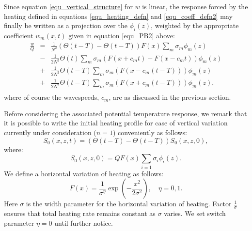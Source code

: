 \documentclass[a4paper,10pt]{article}
\newcommand{\heavi}{\Theta}
\begin{document}
Since equation \ref{equ_vertical_structure} for $w$ is linear, the response forced by the heating defined in equations \ref{equ_heating_defn} and \ref{equ_coeff_defn2}
may finally be written as a projection over the $\phi_i(z)$, weighted by the appropriate coefficient $w_m (x,t)$ given in 
equation \ref{equ_PB2} above:
%
\begin{eqnarray}
\label{equ_w_response}
\frac{w}{Q} & = & \frac{1}{N^2}    \left(\heavi( t-T)  - \heavi( t-T) \right) F(x)                  \sum_m \sigma_m \phi_m(z) \\ \nonumber
                  & - & \frac{1}{2N^2}    \heavi( t)                  \sum_m  \sigma_m  \left(  F(x + c_m t) + F(x - c_m t) \right)  \phi_m(z) \\ \nonumber
                  & + & \frac{1}{2 N^2} \heavi( t-T)  \sum_m \sigma_m  \left( F(x-c_m (t-T)) \right)  \phi_m(z) \\ \nonumber
                  & + & \frac{1}{2 N^2}  \heavi( t-T) \sum_m  \sigma_m \left( F(x+ c_m (t-T))  \right)  \phi_m(z), \\ \nonumber
\end{eqnarray}
%
where of course the wavespeeds, $c_m$, are as discussed in the previous section.

Before considering the associated potential temperature response, we remark that it is possible to 
write the initial heating profile for case of vertical variation currently under consideration ($n=1$) conveniently as follows: 
%
\begin{equation}
\label{equ_3}
S_{0}(x,z,t) = (\heavi( t-T)  - \heavi(t-T) ) S_0(x,z,0),
 \end{equation}
%
where:
%
\begin{equation}
 S_0 (x,z,0) = Q F(x) \sum_{i=1} \sigma_i \phi_i (z).
\end{equation}
%
We define a horizontal variation of heating as follows:
%
\begin{equation}
\label{equ_horizontal_heating}
F(x) = \frac{1}{\sigma^\eta}\exp \left( -\frac{x^2}{2 \sigma^2} \right), \quad \eta =0,1.
\end{equation}
%
Here $\sigma$ is the width parameter for the horizontal variation of heating. Factor $\frac{1}{\sigma}$ 
ensures that total heating rate remains constant as $\sigma$ varies. We set switch parameter $\eta=0$ until further notice. 
%
%
%
\end{document}
